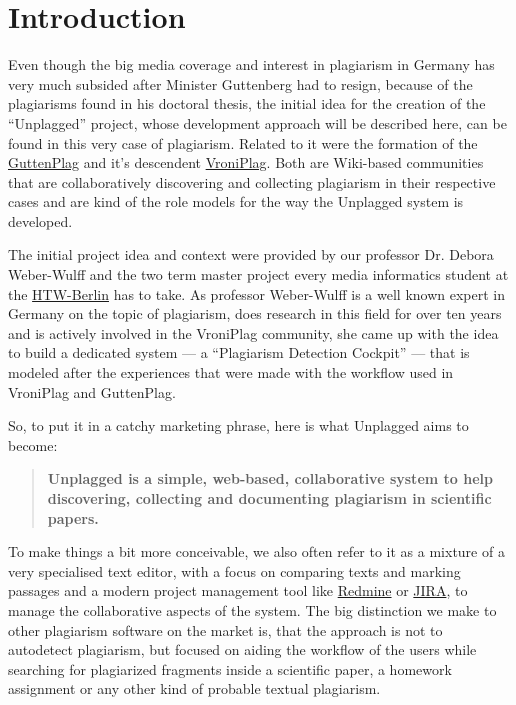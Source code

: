 ﻿\chapter*{Introduction}

Even though the big media coverage and interest in plagiarism in Germany has very much subsided 
after Minister Guttenberg had to resign, because of the plagiarisms found in his doctoral thesis\citep[page 12]{Google2012}, 
the initial idea for the 
creation of the \enquote{Unplagged} project, whose development approach will be described here, can be found in this 
very case of plagiarism. Related to it were the formation of the
\href{http://de.guttenplag.wikia.com/wiki/GuttenPlag\_Wiki}{GuttenPlag} and it's descendent 
\href{http://de.vroniplag.wikia.com/wiki/Home}{VroniPlag}. Both are Wiki-based communities that are collaboratively 
discovering and collecting plagiarism in their respective cases and are kind of the role models for the way the
Unplagged system is developed.

The initial project idea and context were provided by our professor Dr. Debora Weber-Wulff and the two term master project
every media informatics student at the \href{http://htw-berlin.de/}{HTW-Berlin} has to take. As professor Weber-Wulff is 
a well known expert in Germany on the
topic of plagiarism,
does research in this field for over ten years and is actively involved in the VroniPlag
community\citep{Spiegel-Online2011}, she came up with the idea to build a dedicated system --- a \enquote{Plagiarism Detection Cockpit}\citep{Weber-Wulff2011} --- 
that is modeled after the experiences that were made
with the workflow used in VroniPlag and GuttenPlag.

So, to put it in a catchy marketing phrase, here is what Unplagged aims to become: 

\begin{quote}
\textbf{Unplagged is a simple, web-based, collaborative system to help discovering, collecting and 
documenting plagiarism in scientific papers.}
\end{quote}

To make things a bit more conceivable, we also often refer to it as a mixture of a very specialised text editor, with a focus on 
comparing texts and marking 
passages and a modern project management tool like \href{http://www.redmine.org/}{Redmine} or 
\href{http://www.atlassian.com/JIRA}{JIRA}, 
to manage the collaborative aspects of the system. The big distinction we make to other plagiarism software on the market is, 
that the approach is not to autodetect plagiarism, but focused on aiding the workflow of the users while  
searching for plagiarized
fragments inside a scientific paper, a homework assignment or any other kind of probable textual plagiarism.

